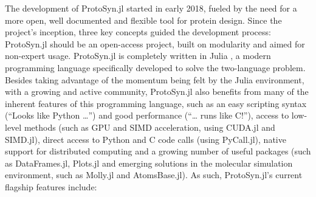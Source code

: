 \documentclass{juliacon}
\begin{document}
The development of ProtoSyn.jl started in early 2018, fueled by the need for a more open, well documented and flexible tool for protein design. Since the project’s inception, three key concepts guided the development process: ProtoSyn.jl should be an open-access project, built on modularity and aimed for non-expert usage. ProtoSyn.jl is completely written in Julia \cite{Bezanson2017, Bezanson2018}, a modern programming language specifically developed to solve the two-language problem. Besides taking advantage of the momentum being felt by the Julia environment, with a growing and active community, ProtoSyn.jl also benefits from many of the inherent features of this programming language, such as an easy scripting syntax (“Looks like Python …”) and good performance (“… runs like C!”), access to low-level methods (such as GPU and SIMD acceleration, using CUDA.jl and SIMD.jl), direct access to Python and C code calls (using PyCall.jl), native support for distributed computing and a growing number of useful packages (such as DataFrames.jl, Plots.jl and emerging solutions in the molecular simulation environment, such as Molly.jl and AtomsBase.jl). As such, ProtoSyn.jl’s current flagship features include:
\end{document}
